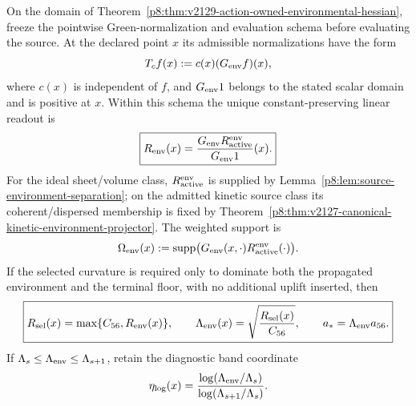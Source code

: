 \documentclass[12pt,a4paper]{article}
\begin{document}
\begin{theorem}
\label{p8:thm:green-kernel-active-contact-selector}
On the domain of
Theorem~\ref{p8:thm:v2129-action-owned-environmental-hessian}, freeze the
pointwise Green-normalization and evaluation schema before evaluating the
source.  At the declared point $x$ its admissible normalizations have the form
\[
 T_cf(x):=c(x)(G_{\rm env}f)(x),
\]
where $c(x)$ is independent of $f$, and $G_{\rm env}1$ belongs to the stated
scalar domain and is positive at $x$.  Within this schema the unique
constant-preserving linear readout is
\begin{equation}
\label{p8:eq:Renv-green-selector}
\boxed{
 R_{\rm env}(x)
 =\frac{G_{\rm env}R_{\rm active}^{\rm env}}
        {G_{\rm env}1}(x).}
\end{equation}
For the ideal sheet/volume class, $R_{\rm active}^{\rm env}$ is supplied by
Lemma~\ref{p8:lem:source-environment-separation}; on the admitted kinetic
source class its coherent/dispersed membership is fixed by
Theorem~\ref{p8:thm:v2127-canonical-kinetic-environment-projector}.  The
weighted support is
\begin{equation}
\label{p8:eq:Omega-vartheta-derived}
 \Omega_{\rm env}(x)
 :=\operatorname{supp}\bigl(G_{\rm env}(x,\cdot)
 R_{\rm active}^{\rm env}(\cdot)\bigr).
\end{equation}
If the selected curvature is required only to dominate both the propagated
environment and the terminal floor, with no additional uplift inserted, then
\begin{equation}
\label{p8:eq:Rsel-floor}
\boxed{
 R_{\rm sel}(x)=\max\{C_{56},R_{\rm env}(x)\},
 \qquad
 \Lambda_{\rm env}(x)=\sqrt{\frac{R_{\rm sel}(x)}{C_{56}}},
 \qquad
 a_*=\Lambda_{\rm env}a_{56}.}
\end{equation}
If $\Lambda_s\le\Lambda_{\rm env}\le\Lambda_{s+1}$, retain the diagnostic
band coordinate
\begin{equation}
\label{p8:eq:env-band-coordinate}
 \eta_{\log}(x)
 =\frac{\log(\Lambda_{\rm env}/\Lambda_s)}
        {\log(\Lambda_{s+1}/\Lambda_s)}.
\end{equation}
\end{theorem}
\end{document}
